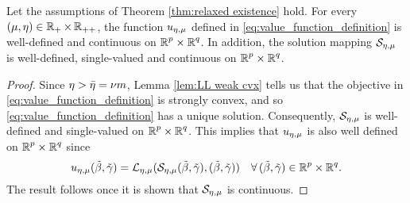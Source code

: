 
\begin{theorem}\label{thm:u cont}
Let the assumptions of Theorem \ref{thm:relaxed existence} hold.
For every $(\mu,\eta)\in\R_+\times\R_{++}$,
the function $\uemu$ defined in \eqref{eq:value_function_definition}
is well-defined and continuous on $\Rp\times\Rq$.
In addition, the solution mapping $\SS_\emu$
is well-defined, single-valued and continuous on $\Rp\times\Rq$.
\end{theorem}

\begin{proof}
Since $\eta>\blam= \nu m$, Lemma \ref{lem:LL weak cvx} 
tells us that the objective in \eqref{eq:value_function_definition}
is strongly convex, 
and so \eqref{eq:value_function_definition} has a unique solution. 
Consequently, $\SS_\emu$ is well-defined and single-valued
on $\Rp\times\Rq$.
This implies that $\uemu$ is also well defined on $\Rp\times\Rq$ since
\[
\uemu(\tbeta,\tgam)= \LL_{\emu}(\SS_\emu(\tbeta,\tgam),\tbg)
    \quad\forall\, (\tbeta,\tgam)\in \Rp\times\Rq.
\]
The result follows once it is shown that $\SS_\emu$ is continuous.


\end{proof}
